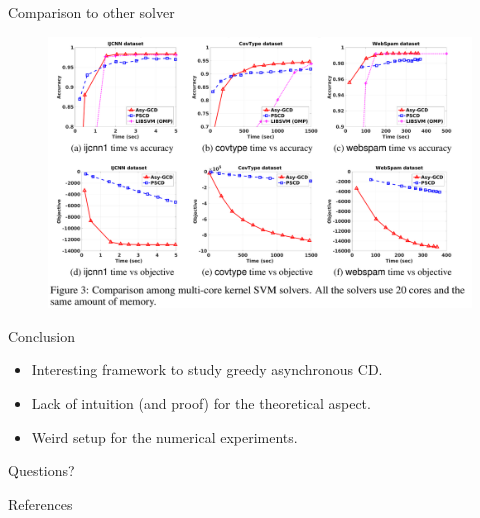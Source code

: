 \documentclass{beamer}
\begin{document}
\begin{frame}{Comparison to other solver}

\begin{figure}[htp]
\centering
\includegraphics[width=\textwidth]{fig3}
\end{figure}
\end{frame}

\begin{frame}{Conclusion}

\begin{itemize}\itemsep1em
	\item Interesting framework to study greedy asynchronous CD.
	\item Lack of intuition (and proof) for the theoretical aspect.
	\item Weird setup for the numerical experiments.
\end{itemize}
	
\end{frame}


\begin{frame}
\begin{center}

\Huge Questions?
	
\end{center}
	
\end{frame}

\begin{frame}[noframenumbering]{References}
	\nocite{*}
	\tiny
\end{frame}
\end{document}
